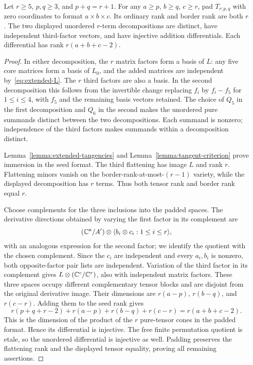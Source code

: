 \begin{proposition}\label{prop:witness-immersion}
Let $r\geq5$, $p,q\geq3$, and $p+q=r+1$.
For any $a\geq p$, $b\geq q$, $c\geq r$, pad
$T_{r;p,q}$ with zero coordinates to format $a\times b\times c$.
Its ordinary rank and border rank are both $r$. The two displayed
unordered $r$-term decompositions are distinct, have independent
third-factor vectors, and have injective addition differentials.
Each differential has rank $r(a+b+c-2)$.
\end{proposition}

\begin{proof}
In either decomposition, the $r$ matrix factors form a basis of $L$:
any five core matrices form a basis of $L_0$, and the added matrices
are independent by~\eqref{eq:extended-L}. The $r$ third factors are
also a basis. In the second decomposition this follows from the
invertible change replacing $f_i$ by $f_i-f_5$ for $1\leq i\leq4$,
with $f_5$ and the remaining basis vectors retained. The choice of
$Q_5$ in the first decomposition and $Q_6$ in the second makes the
unordered pure summands distinct between the two decompositions.
Each summand is nonzero; independence of the third factors makes
summands within a decomposition distinct.

Lemma~\ref{lemma:extended-tangencies} and
Lemma~\ref{lemma:tangent-criterion} prove immersion in the seed
format. The third flattening has image $L$ and rank $r$. Flattening
minors vanish on the border-rank-at-most-$(r-1)$ variety, while the
displayed decomposition has $r$ terms. Thus both tensor rank and
border rank equal $r$.

Choose complements for the three inclusions into the padded spaces.
The derivative directions obtained by varying the first factor in
its complement are
\[
 (\mathbb C^a/A')\otimes
   \langle b_i\otimes c_i:1\leq i\leq r\rangle,
\]
with an analogous expression for the second factor; we identify the
quotient with the chosen complement. Since the $c_i$ are independent
and every $a_i,b_i$ is nonzero, both opposite-factor pair lists are
independent. Variation of the third factor in its complement gives
$L\otimes(\mathbb C^c/\mathbb C^r)$, also with independent matrix factors.
These three spaces occupy different complementary tensor blocks and
are disjoint from the original derivative image. Their dimensions are
$r(a-p)$, $r(b-q)$, and $r(c-r)$. Adding them to the seed rank gives
\[
 r(p+q+r-2)+r(a-p)+r(b-q)+r(c-r)=r(a+b+c-2).
\]
This is the dimension of the product of the $r$ pure-tensor cones in
the padded format. Hence its differential is injective. The free
finite permutation quotient is etale, so the unordered differential
is injective as well. Padding preserves the flattening rank and the
displayed tensor equality, proving all remaining assertions.
\end{proof}


